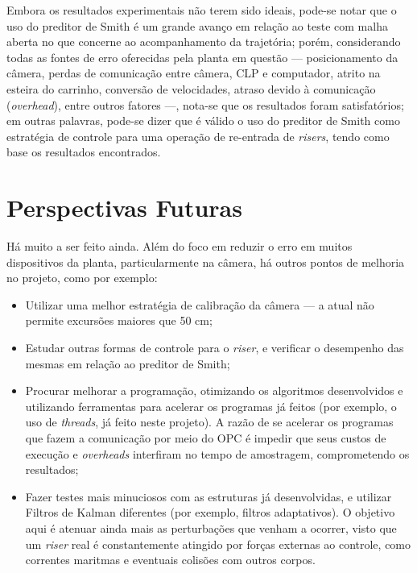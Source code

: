 Embora os resultados experimentais não terem sido ideais, pode-se notar que o uso do preditor de Smith é um grande avanço em relação ao teste com malha aberta no que concerne ao acompanhamento da trajetória; porém, considerando todas as fontes de erro oferecidas pela planta em questão --- posicionamento da câmera, perdas de comunicação entre câmera, CLP e computador, atrito na esteira do carrinho, conversão de velocidades, atraso devido à comunicação (\textit{overhead}), entre outros fatores ---, nota-se que os resultados foram satisfatórios; em outras palavras, pode-se dizer que é válido o uso do preditor de Smith como estratégia de controle para uma operação de re-entrada de \textit{risers}, tendo como base os resultados encontrados.


\section{Perspectivas Futuras}
Há muito a ser feito ainda. Além do foco em reduzir o erro em muitos dispositivos da planta, particularmente na câmera, há outros pontos de melhoria no projeto, como por exemplo:
\begin{itemize}
\item Utilizar uma melhor estratégia de calibração da câmera --- a atual não permite excursões maiores que 50 cm;
\item Estudar outras formas de controle para o \textit{riser}, e verificar o desempenho das mesmas em relação ao preditor de Smith;
\item Procurar melhorar a programação, otimizando os algoritmos desenvolvidos e utilizando ferramentas para acelerar os programas já feitos (por exemplo, o uso de \textit{threads}, já feito neste projeto). A razão de se acelerar os programas que fazem a comunicação por meio do OPC é impedir que seus custos de execução e \textit{overheads} interfiram no tempo de amostragem, comprometendo os resultados;
\item Fazer testes mais minuciosos com as estruturas já desenvolvidas, e utilizar Filtros de Kalman diferentes (por exemplo, filtros adaptativos). O objetivo aqui é atenuar ainda mais as perturbações que venham a ocorrer, visto que um \textit{riser} real é constantemente atingido por forças externas ao controle, como correntes maritmas e eventuais colisões com outros corpos.
\end{itemize}